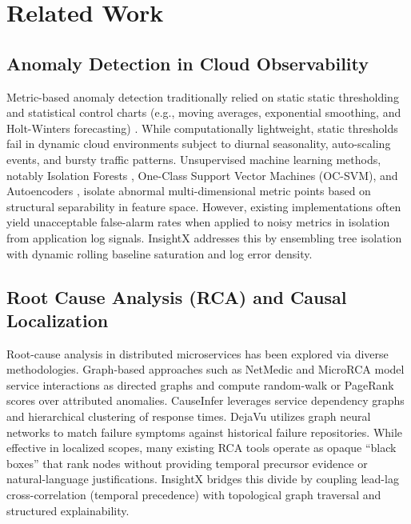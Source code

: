 \documentclass[conference]{IEEEtran}
\begin{document}
\section{Related Work}

\subsection{Anomaly Detection in Cloud Observability}
Metric-based anomaly detection traditionally relied on static static thresholding and statistical control charts (e.g., moving averages, exponential smoothing, and Holt-Winters forecasting) \cite{chandola2009anomaly}. While computationally lightweight, static thresholds fail in dynamic cloud environments subject to diurnal seasonality, auto-scaling events, and bursty traffic patterns. Unsupervised machine learning methods, notably Isolation Forests \cite{liu2008isolation}, One-Class Support Vector Machines (OC-SVM), and Autoencoders \cite{zhou2017anomaly}, isolate abnormal multi-dimensional metric points based on structural separability in feature space. However, existing implementations often yield unacceptable false-alarm rates when applied to noisy metrics in isolation from application log signals. InsightX addresses this by ensembling tree isolation with dynamic rolling baseline saturation and log error density.

\subsection{Root Cause Analysis (RCA) and Causal Localization}
Root-cause analysis in distributed microservices has been explored via diverse methodologies. Graph-based approaches such as NetMedic \cite{kandula2009detailed} and MicroRCA \cite{chen2020microrca} model service interactions as directed graphs and compute random-walk or PageRank scores over attributed anomalies. CauseInfer \cite{chen2014causeinfer} leverages service dependency graphs and hierarchical clustering of response times. DejaVu \cite{li2022dejavu} utilizes graph neural networks to match failure symptoms against historical failure repositories. While effective in localized scopes, many existing RCA tools operate as opaque ``black boxes'' that rank nodes without providing temporal precursor evidence or natural-language justifications. InsightX bridges this divide by coupling lead-lag cross-correlation (temporal precedence) with topological graph traversal and structured explainability.
\end{document}
